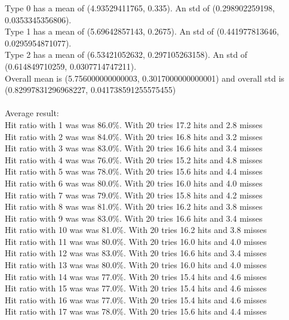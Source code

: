 \documentclass{article}
\begin{document}
Type 0 has a mean of (4.93529411765, 0.335). An std of (0.298902259198, 0.0353345356806).\\
Type 1 has a mean of (5.69642857143, 0.2675). An std of (0.441977813646, 0.0295954871077).\\
Type 2 has a mean of (6.53421052632, 0.297105263158). An std of (0.614849710259, 0.0307714747211).\\
Overall mean is (5.756000000000003, 0.3017000000000001) and overall std is (0.82997831296968227, 0.041738591255575455)\\\\
Average result: \\
Hit ratio with 1 was  was 86.0\%. With 20 tries 17.2 hits and 2.8 misses\\
Hit ratio with 2 was  was 84.0\%. With 20 tries 16.8 hits and 3.2 misses\\
Hit ratio with 3 was  was 83.0\%. With 20 tries 16.6 hits and 3.4 misses\\
Hit ratio with 4 was  was 76.0\%. With 20 tries 15.2 hits and 4.8 misses\\
Hit ratio with 5 was  was 78.0\%. With 20 tries 15.6 hits and 4.4 misses\\
Hit ratio with 6 was  was 80.0\%. With 20 tries 16.0 hits and 4.0 misses\\
Hit ratio with 7 was  was 79.0\%. With 20 tries 15.8 hits and 4.2 misses\\
Hit ratio with 8 was  was 81.0\%. With 20 tries 16.2 hits and 3.8 misses\\
Hit ratio with 9 was  was 83.0\%. With 20 tries 16.6 hits and 3.4 misses\\
Hit ratio with 10 was was 81.0\%. With 20 tries 16.2 hits and 3.8 misses\\
Hit ratio with 11 was was 80.0\%. With 20 tries 16.0 hits and 4.0 misses\\
Hit ratio with 12 was was 83.0\%. With 20 tries 16.6 hits and 3.4 misses\\
Hit ratio with 13 was was 80.0\%. With 20 tries 16.0 hits and 4.0 misses\\
Hit ratio with 14 was was 77.0\%. With 20 tries 15.4 hits and 4.6 misses\\
Hit ratio with 15 was was 77.0\%. With 20 tries 15.4 hits and 4.6 misses\\
Hit ratio with 16 was was 77.0\%. With 20 tries 15.4 hits and 4.6 misses\\
Hit ratio with 17 was was 78.0\%. With 20 tries 15.6 hits and 4.4 misses\\
\end{document}
